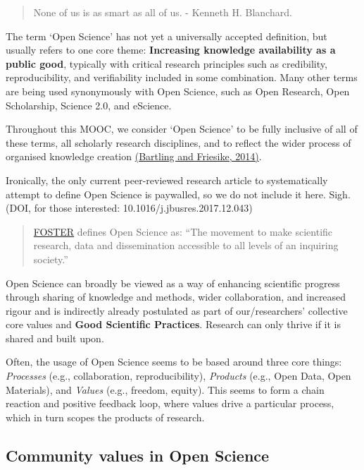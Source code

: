 \documentclass[]{book}
\begin{document}
\begin{quote}
None of us is as smart as all of us. - Kenneth H. Blanchard.
\end{quote}

The term `Open Science' has not yet a universally accepted definition, but usually refers to one core theme: \textbf{Increasing knowledge availability as a public good}, typically with critical research principles such as credibility, reproducibility, and verifiability included in some combination. Many other terms are being used synonymously with Open Science, such as Open Research, Open Scholarship, Science 2.0, and eScience.

Throughout this MOOC, we consider `Open Science' to be fully inclusive of all of these terms, all scholarly research disciplines, and to reflect the wider process of organised knowledge creation \href{https://github.com/OpenScienceMOOC/Module-1-Open-Principles/blob/master/Reading\%20Material_Open\%20Principles/Bartling\%20and\%20Friesike\%2C\%202014.pdf}{(Bartling and Friesike, 2014)}.

Ironically, the only current peer-reviewed research article to systematically attempt to define Open Science is paywalled, so we do not include it here. Sigh. (DOI, for those interested: 10.1016/j.jbusres.2017.12.043)

\begin{quote}
\href{https://www.fosteropenscience.eu/}{FOSTER} defines Open Science as: ``The movement to make scientific research, data and dissemination accessible to all levels of an inquiring society.''
\end{quote}

Open Science can broadly be viewed as a way of enhancing scientific progress through sharing of knowledge and methods, wider collaboration, and increased rigour and is indirectly already postulated as part of our/researchers' collective core values and \textbf{Good Scientific Practices}. Research can only thrive if it is shared and built upon.

Often, the usage of Open Science seems to be based around three core things: \emph{Processes} (e.g., collaboration, reproducibility), \emph{Products} (e.g., Open Data, Open Materials), and \emph{Values} (e.g., freedom, equity). This seems to form a chain reaction and positive feedback loop, where values drive a particular process, which in turn scopes the products of research.

\hypertarget{community-values-in-open-science}{%
\subsection{Community values in Open Science }\label{community-values-in-open-science}}
\end{document}
